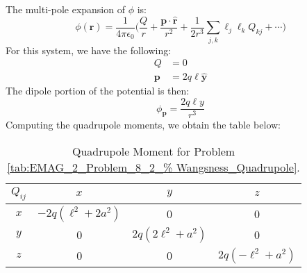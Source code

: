                 \begin{solution}
                    The multi-pole expansion of $\phi$ is:
                    \begin{equation}
                        \phi(\mathbf{r})=\frac{1}{4\pi\epsilon_{0}}\Big(
                        \frac{Q}{r}+
                        \frac{\mathbf{p}\cdot\hat{\mathbf{r}}}{r^{2}}
                        +\frac{1}{2r^{3}}\sum_{j,k}
                        \ell_{j}\ell_{k}Q_{kj}+\cdots\Big)
                    \end{equation}
                    For this system, we have the following:
                    \begin{subequations}
                        \begin{align}
                            Q&=0\\
                            \mathbf{p}&=2q\ell\hat{\mathbf{y}}
                        \end{align}
                    \end{subequations}
                    The dipole portion of the potential is then:
                    \begin{equation}
                        \phi_{\mathbf{p}}=
                        \frac{2q\ell{y}}{r^{3}}
                    \end{equation}
                    Computing the quadrupole moments, we obtain the
                    table below:
                    \begin{table}[H]
                        \centering
                        \captionsetup{type=table}
                        \begin{tabular}{|c|c|c|c|}
                            \hline
                            $Q_{ij}$&$x$&$y$&$z$\\
                            \hline
                            $x$&$-2q(\ell^{2}+2a^{2})$&0&0\\
                            \hline
                            $y$&0&$2q(2\ell^{2}+a^{2})$&0\\
                            \hline
                            $z$&0&0&$2q(-\ell^{2}+a^{2})$\\
                            \hline
                        \end{tabular}
                        \caption{Quadrupole Moment for Problem
                                 \ref{tab:EMAG_2_Problem_8_2_%
                                      Wangsness_Quadrupole}.}
                        \label{tab:EMAG_2_Problem_8_4_%
}
\end{table}
\end{solution}
